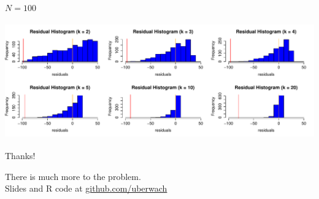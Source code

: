 \documentclass[pdf]{beamer}
\begin{document}
\begin{frame}
\begin{center} $N = 100$ \end{center}
\includegraphics[width=1\textwidth, height=5cm]{residuals} 
\end{frame}

\begin{frame}
\begin{center} Thanks! \end{center} 
\pause There is much more to the problem. \\
\pause Slides and R code at \url{github.com/uberwach}
\end{frame}
\end{document}
